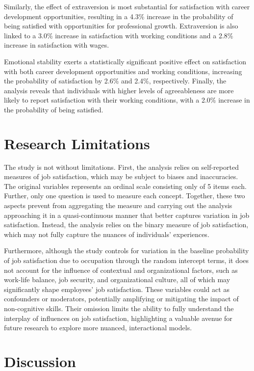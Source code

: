 \documentclass[
]{interact}
\begin{document}
Similarly, the effect of extraversion is most substantial for
satisfaction with career development opportunities, resulting in a 4.3\%
increase in the probability of being satisfied with opportunities for
professional growth. Extraversion is also linked to a 3.0\% increase in
satisfaction with working conditions and a 2.8\% increase in
satisfaction with wages.

Emotional stability exerts a statistically significant positive effect
on satisfaction with both career development opportunities and working
conditions, increasing the probability of satisfaction by 2.6\% and
2.4\%, respectively. Finally, the analysis reveals that individuals with
higher levels of agreeableness are more likely to report satisfaction
with their working conditions, with a 2.0\% increase in the probability
of being satisfied.

\section{Research Limitations}\label{research-limitations}

The study is not without limitations. First, the analysis relies on
self-reported measures of job satisfaction, which may be subject to
biases and inaccuracies. The original variables represents an ordinal
scale consisting only of 5 items each. Further, only one question is
used to measure each concept. Together, these two aspects prevent from
aggregating the measure and carrying out the analysis approaching it in
a quasi-continuous manner that better captures variation in job
satisfaction. Instead, the analysis relies on the binary measure of job
satisfaction, which may not fully capture the nuances of individuals'
experiences.

Furthermore, although the study controls for variation in the baseline
probability of job satisfaction due to occupation through the random
intercept terms, it does not account for the influence of contextual and
organizational factors, such as work-life balance, job security, and
organizational culture, all of which may significantly shape employees'
job satisfaction. These variables could act as confounders or
moderators, potentially amplifying or mitigating the impact of
non-cognitive skills. Their omission limits the ability to fully
understand the interplay of influences on job satisfaction, highlighting
a valuable avenue for future research to explore more nuanced,
interactional models.

\section{Discussion}\label{discussion}
\end{document}
